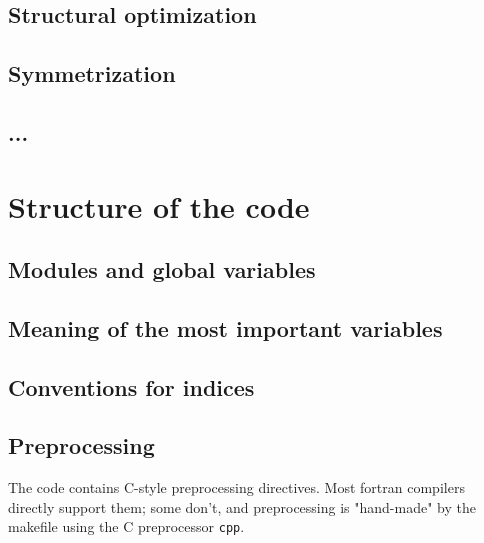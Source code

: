 \documentclass[12pt,a4paper]{article}
\begin{document}
\subsection{Structural optimization}

\subsection{Symmetrization}

\subsection{...}

\section{Structure of the code}

\subsection{Modules and global variables}

\subsection{Meaning of the most important variables}

\subsection{Conventions for indices}

\subsection{Preprocessing}

The code contains C-style preprocessing directives. Most
fortran compilers directly support them; some don't, and
preprocessing is "hand-made" by the makefile using the C
preprocessor {\tt cpp}.
\end{document}
